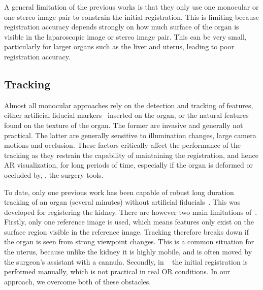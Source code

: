 A general limitation of the previous works is that they only use one monocular or one stereo image pair to constrain the initial registration.
This is limiting because registration accuracy depends strongly on how much surface of the organ is visible in the laparoscopic image or stereo image pair. 
This can be very small, particularly for larger organs such as the liver and uterus, leading to poor registration accuracy. 



\subsection{Tracking}
\label{sec:sotaTracking}
Almost all monocular approaches rely on the detection and tracking of features, either artificial fiducial markers~\cite{Cohen2010Prostate} inserted on the organ, or the natural features found on the texture of the organ. The former are invasive and generally not practical. The latter are generally sensitive to illumination changes, large camera motions and occlusion. These factors critically affect the performance of the tracking as they restrain the capability of maintaining the registration, and hence AR visualization, for long periods of time, especially if the organ is deformed or occluded by, \eg, the surgery tools. 

To date, only one previous work has been capable of robust long duration tracking of an organ (several minutes) without artificial fiducials~\cite{affineTracking}. 
This was developed for registering the kidney. %
There are however two main limitations of~\cite{affineTracking}. 
Firstly, only one reference image is used, which means features only exist on the surface region visible in the reference image. 
Tracking therefore breaks down if the organ is seen from strong viewpoint changes. This is a common situation for the uterus, because unlike the kidney it is highly mobile, and is often moved by the surgeon's assistant with a cannula. 
Secondly, in ~\cite{affineTracking} the initial registration is performed manually, which is not practical in real OR conditions. 
In our approach, we overcome both of these obstacles. 

